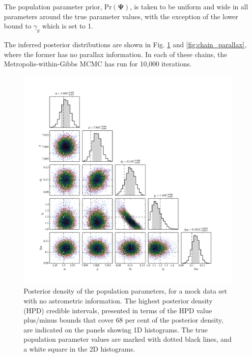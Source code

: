 \documentclass[fleqn,usenatbib]{mnras}
\newcommand{\popp}{\boldsymbol{\Psi}}
\newcommand{\pr}{\text{Pr}}
\begin{document}
The population parameter prior, $\pr(\popp)$, is taken to be uniform and wide in all parameters around the true parameter values, with the exception of the lower bound to $\gamma_g$ which is set to 1.

The inferred posterior distributions are shown in Fig. \ref{fig:chain} and \ref{fig:chain_parallax}, where the former has no parallax information. In each of these chains, the Metropolis-within-Gibbs MCMC has run for 10,000 iterations.

\begin{figure}
	\includegraphics[width=1.\textwidth]{toy_chain.pdf}
    \caption{ Posterior density of the population parameters, for a mock data set with no astrometric information. The highest posterior density (HPD) credible intervals, presented in terms of the HPD value plus/minus bounds that cover 68 per cent of the posterior density, are indicated on the panels showing 1D histograms. The true population parameter values are marked with dotted black lines, and a white square in the 2D histograms.}
    \label{fig:chain}
\end{figure}
\end{document}
